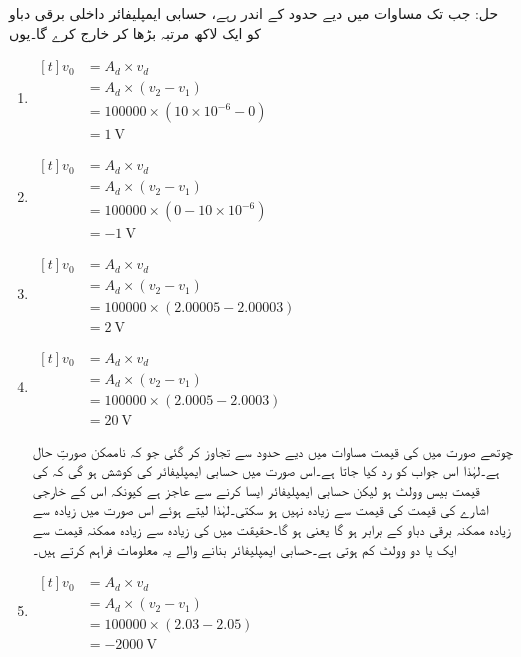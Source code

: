حل:	جب تک  مساوات   میں دیے حدود کے اندر رہے، حسابی ایمپلیفائر داخلی برقی دباو کو ایک لاکھ مرتبہ بڑھا کر خارج کرے گا۔یوں
\begin{enumerate}
\item $\begin{aligned}[t]
v_0 &=A_d \times v_d \\
&=A_d \times \left (v_2 - v_1 \right )\\
&=100000 \times \left(10\times 10^{-6}-0 \right )\\
&=\SI{1}{\volt}
\end{aligned}$
%
\item $\begin{aligned}[t]
v_0 &=A_d \times v_d \\
&=A_d \times \left (v_2 - v_1 \right )\\
&=100000 \times \left(0-10\times 10^{-6} \right )\\
&=\SI{-1}{\volt}
\end{aligned}$
%
\item $\begin{aligned}[t]
v_0 &=A_d \times v_d \\
&=A_d \times \left (v_2 - v_1 \right )\\
&=100000 \times \left(2.00005-2.00003 \right )\\
&=\SI{2}{\volt}
\end{aligned}$

\item $\begin{aligned}[t]
v_0 &=A_d \times v_d \\
&=A_d \times \left (v_2 - v_1 \right )\\
&=100000 \times \left(2.0005-2.0003 \right )\\
&=\SI{20}{\volt}
\end{aligned}$

چوتھے صورت میں  کی قیمت مساوات  میں دیے حدود سے تجاوز کر گئی جو کہ ناممکن صورتِ حال ہے۔لہٰذا اس جواب کو رد کیا جاتا ہے۔اس صورت میں حسابی ایمپلیفائر کی کوشش ہو گی کہ  کی قیمت بیس وولٹ ہو لیکن حسابی ایمپلیفائر ایسا کرنے سے عاجز ہے  کیونکہ اس کے خارجی اشارے  کی قیمت  کی قیمت سے زیادہ نہیں ہو سکتی۔لہٰذا   لیتے ہوئے اس صورت میں  زیادہ سے زیادہ ممکنہ برقی دباو کے برابر ہو گا یعنی ہو گا۔حقیقت میں  کی زیادہ سے زیادہ ممکنہ قیمت  سے ایک یا دو وولٹ کم ہوتی ہے۔حسابی ایمپلیفائر بنانے والے یہ معلومات فراہم کرتے ہیں۔
\item $\begin{aligned}[t]
v_0 &=A_d \times v_d \\
&=A_d \times \left (v_2 - v_1 \right )\\
&=100000 \times \left(2.03-2.05 \right )\\
&=\SI{-2000}{\volt}
\end{aligned}$


\end{enumerate}
